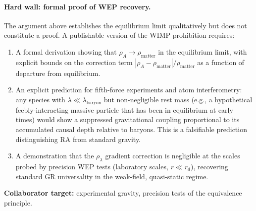 \documentclass[11pt,a4paper]{article}
\theoremstyle{plain}
\theoremstyle{definition}
\theoremstyle{remark}
\begin{document}
\paragraph{Hard wall: formal proof of WEP recovery.}
The argument above establishes the equilibrium limit qualitatively but does not
constitute a proof. A publishable version of the WIMP prohibition requires:
\begin{enumerate}[noitemsep]
  \item A formal derivation showing that $\rho_A \to \rho_{\mathrm{matter}}$ in
  the equilibrium limit, with explicit bounds on the correction term
  $|\rho_A - \rho_{\mathrm{matter}}|/\rho_{\mathrm{matter}}$ as a function of
  departure from equilibrium.
  \item An explicit prediction for fifth-force experiments and atom interferometry:
  any species with $\lambda \ll \lambda_{\mathrm{baryon}}$ but non-negligible rest
  mass (e.g., a hypothetical feebly-interacting massive particle that has been in
  equilibrium at early times) would show a suppressed gravitational coupling
  proportional to its accumulated causal depth relative to baryons. This is a
  falsifiable prediction distinguishing RA from standard gravity.
  \item A demonstration that the $\rho_\lambda$ gradient correction is negligible
  at the scales probed by precision WEP tests (laboratory scales, $r \ll r_d$),
  recovering standard GR universality in the weak-field, quasi-static regime.
\end{enumerate}
\textbf{Collaborator target:} experimental gravity, precision tests of the
equivalence principle.
\end{document}
